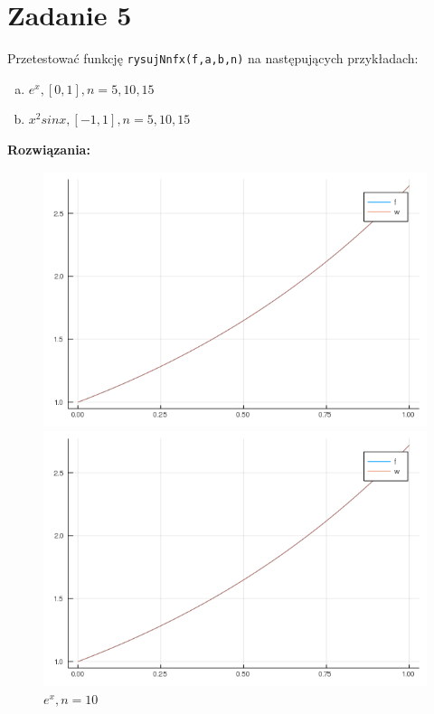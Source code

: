 \documentclass[12pt]{article}
\begin{document}
\section{Zadanie 5}
Przetestować funkcję \texttt{rysujNnfx(f,a,b,n)} na następujących przykładach:
\begin{enumerate}[(a)]
	\item $e^x, [0,1], n=5,10,15$
	\item $x^2sin x, [-1, 1], n=5,10,15$
\end{enumerate}


\noindent \textbf{Rozwiązania:}
\clearpage

\begin{figure}[!htb]
  \includegraphics[width=\linewidth]{myplot_1_5.png}
  \caption{$e^x, n=5$}
\endminipage\hfill
{}
  \includegraphics[width=\linewidth]{myplot_1_10.png}
  \caption{$e^x, n=10$}
\endminipage
\end{figure}
\end{document}
